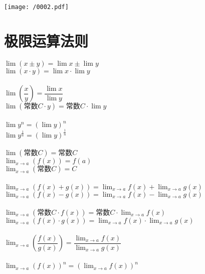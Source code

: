 \documentclass[UTF8]{ctexart}
\begin{document}
\texttt{[image: /0002.pdf]}





\part{极限运算法则}

$ \lim (x \pm y) = \lim x \pm \lim y $ \\
$ \lim (x \cdot y) = \lim x \cdot \lim y $  \\
\\
$ \lim (\dfrac{x} {y}) = \dfrac{\lim x} {\lim y} $ \\
$ \lim (\text{常数} C \cdot y) = \text{常数} C \cdot \lim y $ \\
\\
$ \lim y^n = (\lim y)^n $ \\
$ \lim y^{\frac{1} {n}} = (\lim y)^{\frac{1} {n}} $ \\
\\
$ \lim(\text{常数}C) = \text{常数}C $
\\

$\lim_{x\rightarrow a}\left( f\left( x \right) \right) =f\left( a \right) $ \\
$\lim_{x\rightarrow a}\left( \text{常数}C \right) =C$ \\
\\
$ \lim_{x\rightarrow a}\left( f\left( x \right) +g\left( x \right) \right) =\lim_{x\rightarrow a}f\left( x \right) +\lim_{x\rightarrow a}g\left( x \right) $ \\
$\lim_{x\rightarrow a}\left( f\left( x \right) -g\left( x \right) \right) =\lim_{x\rightarrow a}f\left( x \right) -\lim_{x\rightarrow a}g\left( x \right) $ \\
\\
$\lim_{x\rightarrow a}\left( \text{常数}C\cdot f\left( x \right) \right) =\text{常数}C\cdot \lim_{x\rightarrow a}f\left( x \right) $ \\
$\lim_{x\rightarrow a}\left( f\left( x \right) \cdot g\left( x \right) \right) =\lim_{x\rightarrow a}f\left( x \right) \cdot \lim_{x\rightarrow a}g\left( x \right) $ \\
\\
$\lim_{x\rightarrow a}\left( \dfrac{f\left( x \right)}{g\left( x \right)} \right) =\dfrac{\lim_{x\rightarrow a}f\left( x \right)}{\lim_{x\rightarrow a}g\left( x \right)}$ \\
\\
$\lim_{x\rightarrow a}\left( f\left( x \right) \right) ^n=\left( \lim_{x\rightarrow a}f\left( x \right) \right) ^n$ 
\end{document}
